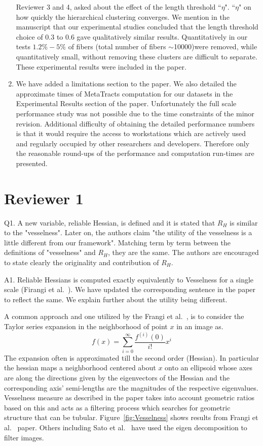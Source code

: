 \documentclass[]{article}
\begin{document}
\begin{enumerate}
{			Reviewer 3 and  4, asked  about the effect of the length threshold ``$\eta$".  ``$\eta$" on how quickly the hierarchical clustering converges. We mention in the manuscript that our experimental studies concluded that the length threshold choice of 0.3 to 0.6 gave qualitatively similar results. Quantitatively in our  tests $1.2\% - 5\%$ of fibers (total number of fibers $\sim$10000)were removed, while quantitatively small, without removing these clusters are difficult to separate. These experimental results were included in the paper.
			}
			\item{
				We have added a limitations section to the paper. We also detailed the approximate times of MetaTracts computation for our datasets in the Experimental Results section of the paper. Unfortunately the full scale performance study was not possible due to the time constraints of the minor revision. Additional difficulty of obtaining the detailed performance numbers is that it would require the access to workstations which are actively used and regularly occupied by other researchers and developers. Therefore only the reasonable round-ups of the performance and computation run-times are presented.
				}
\end{enumerate}
   

\section{Reviewer 1}
\color{red}
Q1. A new variable, reliable Hessian, is defined and it is stated that $R_{H}$ is similar to the "vesselness".  Later on, the authors claim "the utility of the vesselness is a little different from our framework". Matching term by term between the definitions of "vesselness" and $R_{H}$, they are the same. The authors are encouraged to state clearly the originality and contribution of $R_{H}$.
\color{black}

A1. Reliable Hessians is computed exactly equivalently to Vesselness for a single scale (Firangi et al.~\cite{Frangi1998}). We have  updated the corresponding sentence in the paper to reflect the same. We explain further about the utility being different.


A common approach and one utilized by the Frangi et al.~\cite{Frangi1998}, is to consider the Taylor series expansion in the neighborhood of point $x$ in an image as.
\begin{equation}
f(x) = \sum_{i=0}^{\infty}\frac{f^{(i)}(0)}{i!}x^{i}
\end{equation}
The expansion often is approximated till the second order (Hessian). In particular the hessian maps a  neighborhood  centered about $x$ onto an ellipsoid  whose axes are along the directions given by the eigenvectors of the Hessian and the corresponding axis' semi-lengths are the magnitudes of the respective eigenvalues. Vesselness measure as described in the paper takes into account geometric ratios based on this and acts as a filtering process which searches for geometric structure that can be tubular. Figure~\ref{fig:Vesselness} shows results from Frangi et al.~\cite{Frangi1998} paper. Others including Sato et al.~\cite{Sato1997} have used the eigen decomposition to filter images.
\end{document}
